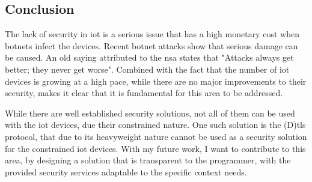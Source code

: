 \documentclass{llncs}
\begin{document}
\subsection{Conclusion}

The lack of security in \gls{iot} is a serious issue that has a high monetary cost
when botnets infect the devices. Recent
botnet attacks show that serious damage can be caused. An old saying attributed to the
\gls{nsa} states that "Attacks always get better; they never get worse".
Combined with the fact that the number of \gls{iot} devices is growing at a high
pace, while there are no major improvements to their security, makes it clear
that it is fundamental for this area to be addressed.

While there are well established security solutions, not all of them can be used
with the \gls{iot} devices, due their constrained nature. One such solution is
the (D)\gls{tls} protocol, that due to its heavyweight nature cannot be used
as a security solution for the constrained \gls{iot} devices. With my future work,
I want to contribute to this area, by designing a solution that is transparent
to the programmer, with the provided security services adaptable to the specific context needs.

%
\nocite{*}


%
\printglossary[style=long]
%
\end{document}
